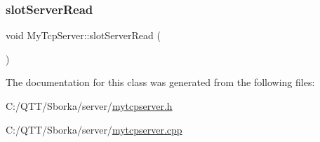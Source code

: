 \mbox{\label{class_my_tcp_server_ab4a64d2eab985d723090963f5c8a2882}} 
\subsubsection{\texorpdfstring{slot\+Server\+Read}{slotServerRead}}
{\footnotesize\ttfamily void My\+Tcp\+Server\+::slot\+Server\+Read (\begin{DoxyParamCaption}{ }\end{DoxyParamCaption})\hspace{0.3cm}{\ttfamily [slot]}}



The documentation for this class was generated from the following files\+:\begin{DoxyCompactItemize}
\item 
C\+:/\+Q\+T\+T/\+Sborka/server/\mbox{\hyperlink{mytcpserver_8h}{mytcpserver.\+h}}\item 
C\+:/\+Q\+T\+T/\+Sborka/server/\mbox{\hyperlink{mytcpserver_8cpp}{mytcpserver.\+cpp}}\end{DoxyCompactItemize}
